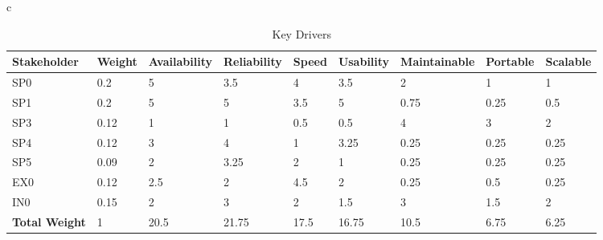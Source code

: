 \begin{table}{c}
	\centering
	\begin{tabular}{|l|l|l|l|l|l|l|l|l|} 
		\hline
		\textbf{Stakeholder}  & \textbf{Weight} & \textbf{Availability} & \textbf{Reliability} & \textbf{Speed} & \textbf{Usability} & \textbf{Maintainable} & \textbf{Portable} & \textbf{Scalable}  \\ 
		\hline
		SP0                   & 0.2             & 5                     & 3.5                  & 4              & 3.5                & 2                     & 1                 & 1                  \\ 
		\hline
		SP1                   & 0.2             & 5                     & 5                    & 3.5            & 5                  & 0.75                  & 0.25              & 0.5                \\ 
		\hline
		SP3                   & 0.12            & 1                     & 1                    & 0.5            & 0.5                & 4                     & 3                 & 2                  \\ 
		\hline
		SP4                   & 0.12            & 3                     & 4                    & 1              & 3.25               & 0.25                  & 0.25              & 0.25               \\ 
		\hline
		SP5                   & 0.09            & 2                     & 3.25                 & 2              & 1                  & 0.25                  & 0.25              & 0.25               \\ 
		\hline
		EX0                   & 0.12            & 2.5                   & 2                    & 4.5            & 2                  & 0.25                  & 0.5               & 0.25               \\ 
		\hline
		IN0                   & 0.15            & 2                     & 3                    & 2              & 1.5                & 3                     & 1.5               & 2                  \\ 
		\hline
		\textbf{Total Weight} & 1               & 20.5                  & 21.75                & 17.5           & 16.75              & 10.5                  & 6.75              & 6.25               \\
		\hline
	\end{tabular}
	\caption{Key Drivers}
	\label{tab:keyDrivers}
\end{table}